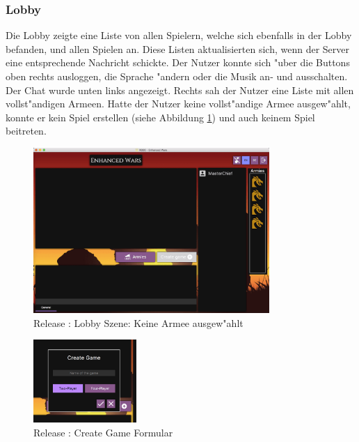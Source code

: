 \documentclass[12pt, titlepage]{scrartcl}
\newcommand{\RN}[1]{%
	\textup{\uppercase\expandafter{\romannumeral#1}}%
}
\begin{document}
            \subsubsection{Lobby} \label{LOBBY}
                Die Lobby zeigte eine Liste von allen Spielern, welche sich ebenfalls in der Lobby befanden, und allen Spielen an. Diese Listen aktualisierten sich, wenn der Server eine entsprechende Nachricht schickte. Der Nutzer konnte sich "uber die Buttons oben rechts ausloggen, die Sprache "andern oder die Musik an- und ausschalten. Der Chat wurde unten links angezeigt. Rechts sah der Nutzer eine Liste mit allen vollst"andigen Armeen. Hatte der Nutzer keine vollst"andige Armee ausgew"ahlt, konnte er kein Spiel erstellen (siehe Abbildung \ref{Lobby_No_Army_Selected}) und auch keinem Spiel beitreten. \\
                \begin{figure}[H] 
    				\centering
    				\includegraphics[width=0.8\textwidth]{images/old_state/lobby/NoArmySelected.png}
    				\caption{Release \RN{2}: Lobby Szene: Keine Armee ausgew"ahlt}
    				\label{Lobby_No_Army_Selected}
			    \end{figure}
			    \begin{figure}
                    \begin{center}
                        \includegraphics[width=0.35\textwidth]{images/old_state/lobby/CreateGame.png}
                    \end{center}
                    \caption{Release \RN{2}: Create Game Formular}
                    \label{Create_Game}
                \end{figure}
\end{document}

